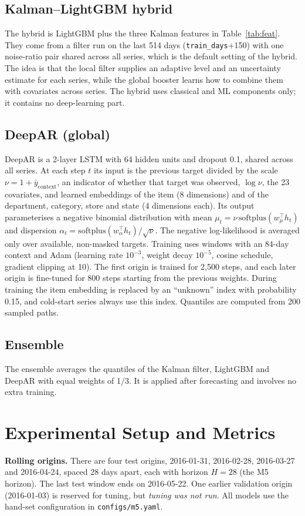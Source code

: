 \documentclass[conference]{IEEEtran}
\begin{document}
\subsection{Kalman--LightGBM hybrid}
The hybrid is LightGBM plus the three Kalman features in Table~\ref{tab:feat}. They come from a filter run on the last 514 days (\texttt{train\_days}+150) with one noise-ratio pair shared across all series, which is the default setting of the hybrid. The idea is that the local filter supplies an adaptive level and an uncertainty estimate for each series, while the global booster learns how to combine them with covariates across series. The hybrid uses classical and ML components only; it contains no deep-learning part.

\subsection{DeepAR (global)}
DeepAR is a 2-layer LSTM with 64 hidden units and dropout 0.1, shared across all series. At each step $t$ its input is the previous target divided by the scale $\nu=1+\bar y_{\text{context}}$, an indicator of whether that target was observed, $\log\nu$, the 23 covariates, and learned embeddings of the item (8 dimensions) and of the department, category, store and state (4 dimensions each). Its output parameterises a negative binomial distribution with mean $\mu_t=\nu\,\mathrm{softplus}(w_\mu^\top h_t)$ and dispersion $\alpha_t=\mathrm{softplus}(w_\alpha^\top h_t)/\sqrt{\nu}$. The negative log-likelihood is averaged only over available, non-masked targets. Training uses windows with an 84-day context and Adam (learning rate $10^{-3}$, weight decay $10^{-5}$, cosine schedule, gradient clipping at 10). The first origin is trained for 2,500 steps, and each later origin is fine-tuned for 800 steps starting from the previous weights. During training the item embedding is replaced by an ``unknown'' index with probability 0.15, and cold-start series always use this index. Quantiles are computed from 200 sampled paths.

\subsection{Ensemble}
The ensemble averages the quantiles of the Kalman filter, LightGBM and DeepAR with equal weights of 1/3. It is applied after forecasting and involves no extra training.

\section{Experimental Setup and Metrics}\label{sec:setup}
\textbf{Rolling origins.} There are four test origins, 2016-01-31, 2016-02-28, 2016-03-27 and 2016-04-24, spaced 28 days apart, each with horizon $H=28$ (the M5 horizon). The last test window ends on 2016-05-22. One earlier validation origin (2016-01-03) is reserved for tuning, but \emph{tuning was not run}. All models use the hand-set configuration in \texttt{configs/m5.yaml}.
\end{document}
